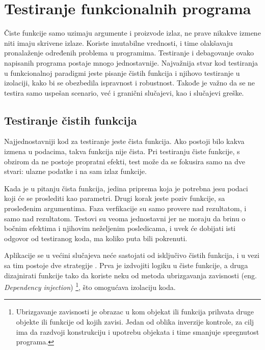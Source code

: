 \documentclass[12pt,oneside]{memoir}
\begin{document}
\section{Testiranje funkcionalnih programa}

\par Čiste funkcije samo uzimaju argumente i proizvode izlaz, ne prave nikakve izmene niti imaju skrivene izlaze. Koriste imutabilne vrednosti, i time olakšavaju pronalaženje određenih problema u programima. Testiranje i debagovanje ovako napisanih programa postaje mnogo jednostavnije. Najvažnija stvar kod testiranja u funkcionalnoj paradigmi jeste pisanje čistih funkcija i njihovo testiranje u izolaciji, kako bi se obezbedila ispravnost i robustnost. Takođe je važno da se ne testira samo uspešan scenario, već i granični slučajevi, kao i slučajevi greške.

\subsection{Testiranje čistih funkcija}

\par Najjednostavniji kod za testiranje jeste čista funkcija. Ako postoji bilo kakva izmena u podacima, takva funkcija nije čista. Pri testiranju čiste funkcije, s obzirom da ne postoje propratni efekti, test može da se fokusira samo na dve stvari: ulazne podatke i na sam izlaz funkcije. 
\par Kada je u pitanju čista funkcija, jedina priprema koja je potrebna jesu podaci koji će se proslediti kao parametri. Drugi korak jeste poziv funkcije, sa prosleđenim argumentima. Faza verfikacije su samo provere nad rezultatom, i samo nad rezultatom. Testovi su veoma jednostavni jer ne moraju da brinu o bočnim efektima i njihovim neželjenim posledicama, i uvek će dobijati  isti odgovor od testiranog koda, ma koliko puta bili pokrenuti. 
\par Aplikacije se u većini slučajeva neće sastojati od isključivo čistih funkcija, i u vezi sa tim postoje dve strategije \cite{testingelixir}. Prva je izdvojiti logiku u čiste funkcije, a druga dizajnirati funkcije tako da koriste neku od metoda ubrizgavanja zavisnosti (eng. \textit{Dependency injection}) \footnote{Ubrizgavanje zavisnosti je obrazac u kom objekat ili funkcija prihvata druge objekte ili funkcije od kojih zavisi. Jedan od oblika inverzije kontrole, za cilj ima da razdvoji konstrukciju i upotrebu objekata i time smanjuje spregnutost programa.}, što omogućava izolaciju koda.
\end{document}
